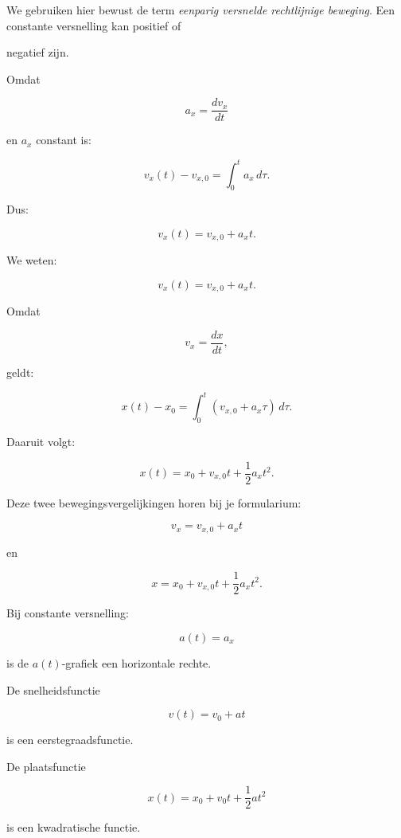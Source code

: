 \documentclass{ximera}
\begin{document}
We gebruiken hier bewust de term \emph{eenparig versnelde rechtlijnige beweging}. Een constante versnelling kan positief of

negatief zijn.


Omdat

\[a_x=\frac{dv_x}{dt}\]

en $a_x$ constant is:

\[v_x(t)-v_{x,0} = \int_0^t a_x\,d\tau.\]

Dus:

\[\boxed{ v_x(t)=v_{x,0}+a_xt. }\]


We weten:

\[v_x(t)=v_{x,0}+a_xt.\]

Omdat

\[v_x=\frac{dx}{dt},\]

geldt:

\[x(t)-x_0 = \int_0^t\left(v_{x,0}+a_x\tau\right)\,d\tau.\]

Daaruit volgt:

\[\boxed{ x(t) = x_0+v_{x,0}t+\frac12a_xt^2. }\]

Deze twee bewegingsvergelijkingen horen bij je formularium:

\[\boxed{ v_x=v_{x,0}+a_xt }\]

en

\[\boxed{ x=x_0+v_{x,0}t+\frac12a_xt^2. }\]


Bij constante versnelling:

\[a(t)=a_x\]

is de $a(t)$-grafiek een horizontale rechte.

De snelheidsfunctie

\[v(t)=v_0+at\]

is een eerstegraadsfunctie.

De plaatsfunctie

\[x(t)=x_0+v_0t+\frac12at^2\]

is een kwadratische functie.
\end{document}
